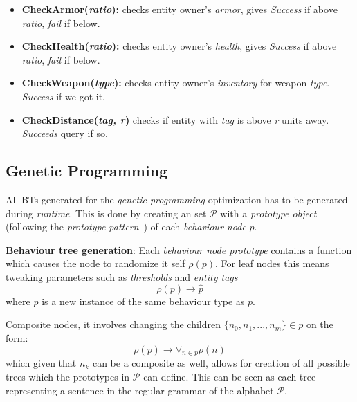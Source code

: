 \documentclass[a4paper, twocolumn]{article}
\begin{document}
        \begin{itemize}
            \item{\textbf{CheckArmor(\emph{ratio}):} checks entity owner's \emph{armor}, gives \emph{Success} if above \emph{ratio}, \emph{fail} if below.}
            \item{\textbf{CheckHealth(\emph{ratio}):} checks entity owner's \emph{health}, gives \emph{Success} if above \emph{ratio}, \emph{fail} if below.}
            \item{\textbf{CheckWeapon(\emph{type}):} checks entity owner's \emph{inventory} for weapon \emph{type}. \emph{Success} if we got it.}
            \item{\textbf{CheckDistance(\emph{tag, r})} checks if entity with \emph{tag} is above \emph{r} units away. \emph{Succeeds} query if so.}
        \end{itemize}

        \clearpage

        \subsection{Genetic Programming} \label{sec:genetic_programming_implementation}

        All BTs generated for the \textit{genetic programming} optimization has to be generated during \textit{runtime}. This is done by creating an set \(\mathcal{P}\) with a \textit{prototype object} (following the \textit{prototype pattern}~\cite{nystrom2014game}) of each \textit{behaviour node} \(p\).

        \textbf{Behaviour tree generation}: Each \textit{behaviour node prototype} contains a function which causes the node to randomize it self \(\rho(p)\). For leaf nodes this means tweaking parameters such as \textit{thresholds} and \textit{entity tags}
        \begin{equation*}
            \rho(p) \rightarrow \hat{p}
        \end{equation*}
        where \(\hat{p}\) is a new instance of the same behaviour type as \(p\).

        Composite nodes, it involves changing the children \(\{n_0,n_1,...,n_m\} \in p\) on the form:
        \begin{equation*}
            \rho(p) \rightarrow \forall_{n \in p}{\rho(n)}
        \end{equation*}
        which given that \(n_k\) can be a composite as well, allows for creation of all possible trees which the prototypes in \(\mathcal{P}\) can define. This can be seen as each tree representing a sentence in the regular grammar of the alphabet \(\mathcal{P}\).
\end{document}
